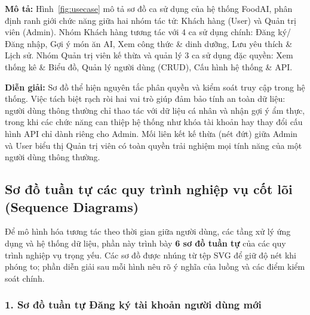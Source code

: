\noindent\textbf{Mô tả:} Hình~\ref{fig:usecase} mô tả sơ đồ ca sử dụng của hệ thống FoodAI, phân định ranh giới chức năng giữa hai nhóm tác tử: Khách hàng (User) và Quản trị viên (Admin). Nhóm Khách hàng tương tác với 4 ca sử dụng chính: Đăng ký/Đăng nhập, Gợi ý món ăn AI, Xem công thức \& dinh dưỡng, Lưu yêu thích \& Lịch sử. Nhóm Quản trị viên kế thừa và quản lý 3 ca sử dụng đặc quyền: Xem thống kê \& Biểu đồ, Quản lý người dùng (CRUD), Cấu hình hệ thống \& API.

\noindent\textbf{Diễn giải:} Sơ đồ thể hiện nguyên tắc phân quyền và kiểm soát truy cập trong hệ thống. Việc tách biệt rạch ròi hai vai trò giúp đảm bảo tính an toàn dữ liệu: người dùng thông thường chỉ thao tác với dữ liệu cá nhân và nhận gợi ý ẩm thực, trong khi các chức năng can thiệp hệ thống như khóa tài khoản hay thay đổi cấu hình API chỉ dành riêng cho Admin. Mối liên kết kế thừa (nét đứt) giữa Admin và User biểu thị Quản trị viên có toàn quyền trải nghiệm mọi tính năng của một người dùng thông thường.

\subsection{Sơ đồ tuần tự các quy trình nghiệp vụ cốt lõi (Sequence Diagrams)}

Để mô hình hóa tương tác theo thời gian giữa người dùng, các tầng xử lý ứng dụng và hệ thống dữ liệu, phần này trình bày \textbf{6 sơ đồ tuần tự } của các quy trình nghiệp vụ trọng yếu. Các sơ đồ được nhúng từ tệp SVG để giữ độ nét khi phóng to; phần diễn giải sau mỗi hình nêu rõ ý nghĩa của luồng và các điểm kiểm soát chính.

\subsubsection{1. Sơ đồ tuần tự Đăng ký tài khoản người dùng mới}

